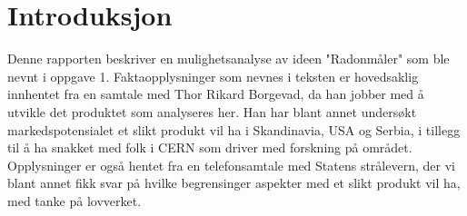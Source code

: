 \section{Introduksjon}

Denne rapporten beskriver en mulighetsanalyse av ideen "Radonmåler" som ble nevnt i oppgave 1.
Faktaopplysninger som nevnes i teksten er hovedsaklig innhentet fra en samtale med Thor Rikard Borgevad, da han jobber med å utvikle det produktet som analyseres her. Han har blant annet undersøkt markedspotensialet et slikt produkt vil ha i Skandinavia, USA og Serbia, i tillegg til å ha snakket med folk i CERN som driver med forskning på området.
Opplysninger er også hentet fra en telefonsamtale med Statens strålevern, der vi blant annet fikk svar på hvilke begrensinger aspekter med et slikt produkt vil ha, med tanke på lovverket.  

